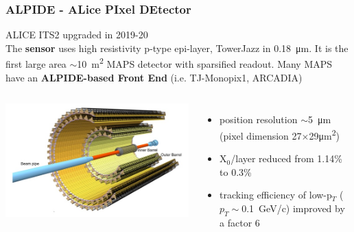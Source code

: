     \begin{frame}[noframenumbering]
        \frametitle{ALPIDE - ALice PIxel DEtector}
        ALICE ITS2 upgraded in 2019-20\\
        \smallskip
        The \textbf{sensor} uses high resistivity p-type epi-layer, TowerJazz in \SI{0.18}{\um}. It is the first large area $\sim$\SI{10}{m\squared} MAPS detector with sparsified readout.
        Many MAPS have an \textbf{ALPIDE-based Front End} (i.e. TJ-Monopix1, ARCADIA)
        \begin{columns}
                \includegraphics[width=1.3\linewidth]{figures/pixel_detectors_usage/alice.png}
            \begin{itemize}
                \item position resolution $\sim$\SI{5}{\um} (pixel dimension 27$\times$29\si{\um\squared})
                \item X$_0$/layer reduced from 1.14\% to 0.3\%
                \item tracking efficiency of low-p$_T$ ($p_T \sim$\SI{0.1}{GeV/c}) improved by a factor 6
            \end{itemize}
        \end{columns}
    \end{frame} 


